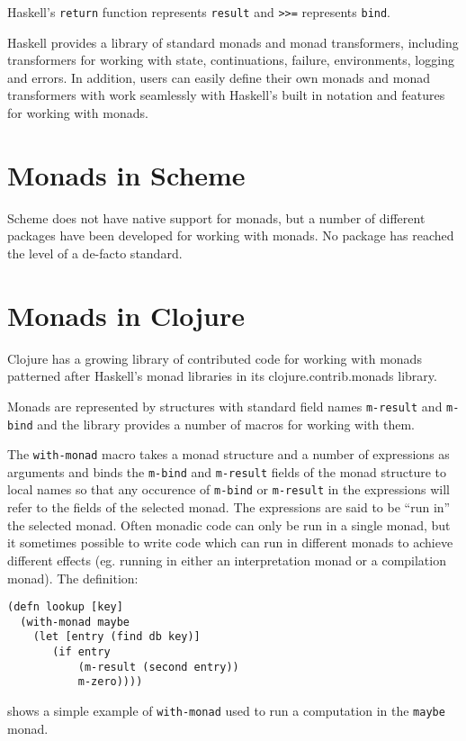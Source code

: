\documentclass[natbib,10pt]{sigplanconf}
\begin{document}
Haskell's {\tt return} function represents {\tt result} and {\tt >>=}
represents {\tt bind}.

Haskell provides a library of standard monads and monad transformers,
including transformers for working with state, continuations, failure,
environments, logging and errors.  In addition, users can easily
define their own monads and monad transformers with work seamlessly
with Haskell's built in notation and features for working with monads.

\section{Monads in Scheme}

Scheme does not have native support for monads, but a number of
different packages have been developed for working with monads.  No
package has reached the level of a de-facto standard.

\section{Monads in Clojure}

Clojure has a growing library of contributed code for working with
monads patterned after Haskell's monad libraries in its
clojure.contrib.monads library.

Monads are represented by structures with standard field names
{\tt m-result} and {\tt m-bind} and the library provides a number of
macros for working with them.

The {\tt with-monad} macro takes a monad structure and a number of
expressions as arguments and binds the {\tt m-bind} and {\tt m-result}
fields of the monad structure to local names so that any occurence of
{\tt m-bind} or {\tt m-result} in the expressions will refer to the
fields of the selected monad.  The expressions are said to be ``run
in'' the selected monad.  Often monadic code can only be run in a
single monad, but it sometimes possible to write code which can run in
different monads to achieve different effects (eg. running in either
an interpretation monad or a compilation monad).  The definition:
\begin{verbatim}
(defn lookup [key]
  (with-monad maybe
    (let [entry (find db key)]
       (if entry
           (m-result (second entry))
           m-zero))))
\end{verbatim}
shows a simple example of {\tt with-monad} used to run a computation
in the {\tt maybe} monad.
\end{document}
